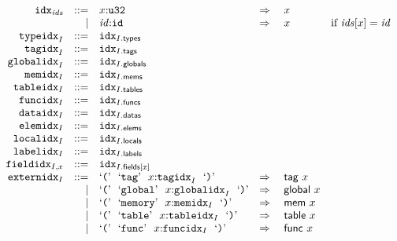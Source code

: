 \vspace{1ex}

$$
\begin{array}[t]{@{}lrrl@{}l@{}l@{}l@{}}
& {{\mathtt{idx}}}_{{\mathit{ids}}} & ::= & x{:}{\mathtt{u32}} & \quad\Rightarrow\quad{} & x \\
& & | & {\mathit{id}}{:}{\mathtt{id}} & \quad\Rightarrow\quad{} & x & \quad \mbox{if}~ {\mathit{ids}}{}[x] = {\mathit{id}} \\
& {{\mathtt{typeidx}}}_{I} & ::= & {{\mathtt{idx}}}_{I{.}\mathsf{types}} \\
& {{\mathtt{tagidx}}}_{I} & ::= & {{\mathtt{idx}}}_{I{.}\mathsf{tags}} \\
& {{\mathtt{globalidx}}}_{I} & ::= & {{\mathtt{idx}}}_{I{.}\mathsf{globals}} \\
& {{\mathtt{memidx}}}_{I} & ::= & {{\mathtt{idx}}}_{I{.}\mathsf{mems}} \\
& {{\mathtt{tableidx}}}_{I} & ::= & {{\mathtt{idx}}}_{I{.}\mathsf{tables}} \\
& {{\mathtt{funcidx}}}_{I} & ::= & {{\mathtt{idx}}}_{I{.}\mathsf{funcs}} \\
& {{\mathtt{dataidx}}}_{I} & ::= & {{\mathtt{idx}}}_{I{.}\mathsf{datas}} \\
& {{\mathtt{elemidx}}}_{I} & ::= & {{\mathtt{idx}}}_{I{.}\mathsf{elems}} \\
& {{\mathtt{localidx}}}_{I} & ::= & {{\mathtt{idx}}}_{I{.}\mathsf{locals}} \\
& {{\mathtt{labelidx}}}_{I} & ::= & {{\mathtt{idx}}}_{I{.}\mathsf{labels}} \\
& {{\mathtt{fieldidx}}}_{I, x} & ::= & {{\mathtt{idx}}}_{I{.}\mathsf{fields}{}[x]} \\
& {{\mathtt{externidx}}}_{I} & ::= & \mbox{‘\texttt{{(}}’}~~\mbox{‘\texttt{tag}’}~~x{:}{{\mathtt{tagidx}}}_{I}~~\mbox{‘\texttt{{)}}’} & \quad\Rightarrow\quad{} & \mathsf{tag}~x \\
& & | & \mbox{‘\texttt{{(}}’}~~\mbox{‘\texttt{global}’}~~x{:}{{\mathtt{globalidx}}}_{I}~~\mbox{‘\texttt{{)}}’} & \quad\Rightarrow\quad{} & \mathsf{global}~x \\
& & | & \mbox{‘\texttt{{(}}’}~~\mbox{‘\texttt{memory}’}~~x{:}{{\mathtt{memidx}}}_{I}~~\mbox{‘\texttt{{)}}’} & \quad\Rightarrow\quad{} & \mathsf{mem}~x \\
& & | & \mbox{‘\texttt{{(}}’}~~\mbox{‘\texttt{table}’}~~x{:}{{\mathtt{tableidx}}}_{I}~~\mbox{‘\texttt{{)}}’} & \quad\Rightarrow\quad{} & \mathsf{table}~x \\
& & | & \mbox{‘\texttt{{(}}’}~~\mbox{‘\texttt{func}’}~~x{:}{{\mathtt{funcidx}}}_{I}~~\mbox{‘\texttt{{)}}’} & \quad\Rightarrow\quad{} & \mathsf{func}~x \\
\end{array}
$$

